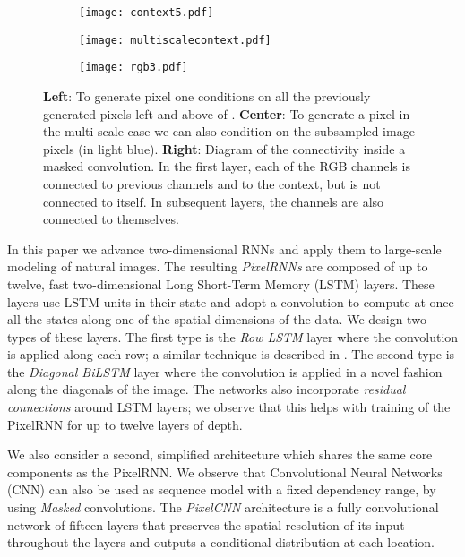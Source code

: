 \documentclass{article}
\begin{document}
\begin{figure}[h]

\hfill
\begin{subfigure}{.14\textwidth}
	\texttt{[image: context5.pdf]}
\end{subfigure}
\hfill
\begin{subfigure}{.14\textwidth}
	\texttt{[image: multiscalecontext.pdf]}
\end{subfigure}
\hfill
\begin{subfigure}{.16\textwidth}
	\texttt{[image: rgb3.pdf]}
\end{subfigure}
\hfill
\caption{\textbf{Left}: To generate pixel  one conditions on all the previously generated pixels left and above of . \textbf{Center}: To generate a pixel in the multi-scale case we can also condition on the subsampled image pixels (in light blue). \textbf{Right}: Diagram of the connectivity inside a masked convolution. In the first layer, each of the RGB channels is connected to previous channels and to the context, but is not connected to itself. In subsequent layers, the channels are also connected to themselves.}
\vspace{-0.2cm}
\label{depen}

\end{figure}

In this paper we advance two-dimensional RNNs and apply them to large-scale modeling of natural images.
The resulting \emph{PixelRNNs} are composed of up to twelve, fast two-dimensional Long Short-Term Memory (LSTM) layers. These layers use LSTM units in their state \cite{hochreiter1997long, graves2009offline}  and adopt a convolution to compute at once all the states along one of the spatial dimensions of the data. We design two types of these layers. The first type is the \emph{Row LSTM} layer where the convolution is applied along each row; a similar technique is described in \cite{NIPS2015_5642}. The second type is the \emph{Diagonal BiLSTM} layer where the convolution is applied in a novel fashion along the diagonals of the image. The networks also incorporate \emph{residual connections} \cite{DBLP:journals/corr/HeZRS15} around LSTM layers; we observe that this helps with training of the PixelRNN for up to twelve layers of depth. 

We also consider a second, simplified architecture which shares the same core components as the PixelRNN. 
We observe that Convolutional Neural Networks (CNN) can also be used as sequence model with a fixed dependency range, by using \emph{Masked} convolutions. The \emph{PixelCNN} architecture is a fully convolutional network of fifteen layers that preserves the spatial resolution of its input throughout the layers and outputs a conditional distribution at each location.
 
\end{document}
